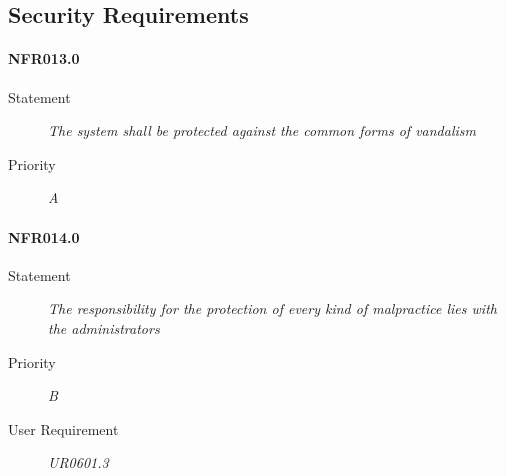 \subsection{Security Requirements}

\paragraph{NFR013.0}
\begin{description}
\item [Statement] \textit{
The system shall be protected against the common forms of vandalism
}
\item [Priority] \textit{A}

\end{description}

\paragraph{NFR014.0}
\begin{description}
\item [Statement] \textit{
The responsibility for the protection of every kind of malpractice lies with the administrators
}
\item [Priority] \textit{B}
\item[User Requirement] \textit{UR0601.3}
\end{description}

